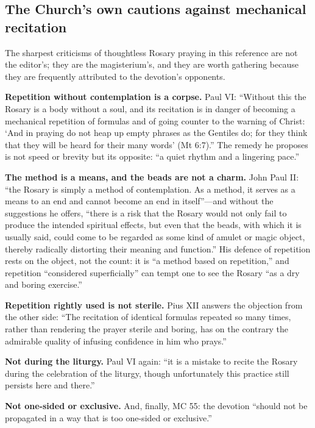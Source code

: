 \subsection{The Church's own cautions against mechanical recitation}
\label{sec:cautions}

The sharpest criticisms of thoughtless Rosary praying in this reference
are not the editor's; they are the magisterium's, and they are worth
gathering because they are frequently attributed to the devotion's
opponents.

\textbf{Repetition without contemplation is a corpse.} Paul VI: ``Without
this the Rosary is a body without a soul, and its recitation is in danger
of becoming a mechanical repetition of formulas and of going counter to
the warning of Christ: `And in praying do not heap up empty phrases as
the Gentiles do; for they think that they will be heard for their many
words' (Mt 6:7).'' The remedy he proposes is not speed or brevity but
its opposite: ``a quiet rhythm and a lingering pace.''

\textbf{The method is a means, and the beads are not a charm.} John Paul
II: ``the Rosary is simply a method of contemplation. As a method, it
serves as a means to an end and cannot become an end in itself''---and
without the suggestions he offers, ``there is a risk that the Rosary
would not only fail to produce the intended spiritual effects, but even
that the beads, with which it is usually said, could come to be regarded
as some kind of amulet or magic object, thereby radically distorting
their meaning and function.'' His defence of repetition rests on the
object, not the count: it is ``a method based on repetition,'' and
repetition ``considered superficially'' can tempt one to see the Rosary
``as a dry and boring exercise.''

\textbf{Repetition rightly used is not sterile.} Pius XII answers the
objection from the other side: ``The recitation of identical formulas
repeated so many times, rather than rendering the prayer sterile and
boring, has on the contrary the admirable quality of infusing confidence
in him who prays.''

\textbf{Not during the liturgy.} Paul VI again: ``it is a mistake to
recite the Rosary during the celebration of the liturgy, though
unfortunately this practice still persists here and there.''

\textbf{Not one-sided or exclusive.} And, finally, MC 55: the devotion
``should not be propagated in a way that is too one-sided or
exclusive.''

